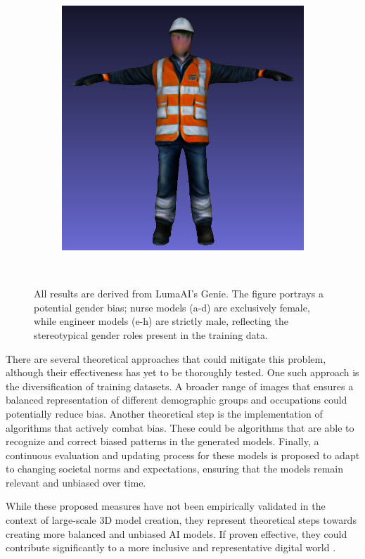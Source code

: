 \begin{figure}[H]
\begin{subfigure}[b]{0.324\textwidth}
        \includegraphics[width=\textwidth]{etc/bias/bias_engineer_genie_4.png}
        \caption{}
    \end{subfigure}
    \caption{All results are derived from LumaAI's Genie. The figure portrays a potential gender bias; nurse models (a-d) are exclusively female, while engineer models (e-h) are strictly male, reflecting the stereotypical gender roles present in the training data.}~\label{fig:biasNurseEngineer}
\end{figure}

There are several theoretical approaches that could mitigate this problem, although their effectiveness has yet to be thoroughly tested. One such approach is the diversification of training datasets. A broader range of images that ensures a balanced representation of different demographic groups and occupations could potentially reduce bias. Another theoretical step is the implementation of algorithms that actively combat bias. These could be algorithms that are able to recognize and correct biased patterns in the generated models.  Finally, a continuous evaluation and updating process for these models is proposed to adapt to changing societal norms and expectations, ensuring that the models remain relevant and unbiased over time.

While these proposed measures have not been empirically validated in the context of large-scale 3D model creation, they represent theoretical steps towards creating more balanced and unbiased AI models. If proven effective, they could contribute significantly to a more inclusive and representative digital world \citep{luccioni2023stable}.
